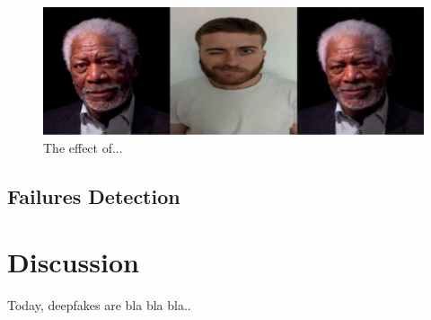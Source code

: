 \documentclass[english,12pt]{article}
\begin{document}
\begin{figure}[htb]
  \begin{centering}
      \includegraphics[scale=0.29]{images/Oren_wink_freeman.PNG}
  \par\end{centering}
  \caption{\label{fig:Oren_wink_freeman}The effect of...}
\end{figure}

\subsection{Failures Detection}



\section{Discussion} \label{discussion}

Today, deepfakes are bla bla bla..

\pagebreak{}




\end{document}
